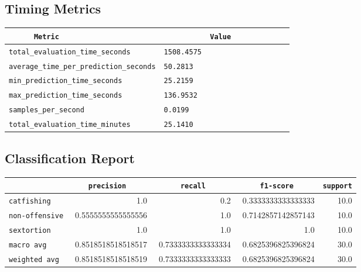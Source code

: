 \documentclass{article}
\begin{document}
\subsection{Timing Metrics}

\begin{center}
\begin{tabular}{l | l} \hline
    \verb|      Metric     | & \verb|           Value           | \\ \hline
    \hline
    \verb|total_evaluation_time_seconds| & \verb|1508.4575                    | \\ \hline
    \verb|average_time_per_prediction_seconds| & \verb|50.2813                      | \\ \hline
    \verb|min_prediction_time_seconds| & \verb|25.2159                      | \\ \hline
    \verb|max_prediction_time_seconds| & \verb|136.9532                     | \\ \hline
    \verb|samples_per_second| & \verb|0.0199                       | \\ \hline
    \verb|total_evaluation_time_minutes| & \verb|25.1410                      | \\ \hline
\end{tabular}
\end{center}

\subsection{Classification Report}

\begin{center}
\begin{tabular}{l | r | r | r | r} \hline
    \verb|            | & \verb|    precision     | & \verb|      recall      | & \verb|     f1-score     | & \verb|support| \\ \hline
    \hline
    \verb|catfishing | & 1.0 & 0.2 & 0.3333333333333333 &    10.0 \\ \hline
    \verb|non-offensive| & 0.5555555555555556 & 1.0 & 0.7142857142857143 &    10.0 \\ \hline
    \verb|sextortion | & 1.0 & 1.0 & 1.0 &    10.0 \\ \hline
    \verb|macro avg  | & 0.8518518518518517 & 0.7333333333333334 & 0.6825396825396824 &    30.0 \\ \hline
    \verb|weighted avg| & 0.8518518518518519 & 0.7333333333333333 & 0.6825396825396824 &    30.0 \\ \hline
\end{tabular}
\end{center}
\end{document}
